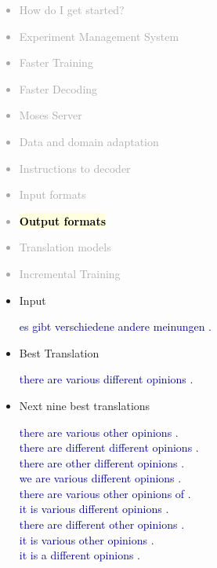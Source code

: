 \documentclass[landscape]{uedslides2C}
\newcommand{\example}[1]{\textcolor{darkblue}{\rm #1}}
\newcommand{\currenttopic}[1]{\colorbox{lightyellow}{\textcolor{black}{\bf #1}}}
\begin{document}

\vspace{-5mm}
\textcolor{darkgrey}{
\small
\begin{itemize} \itemsep -1mm
\item {How do I get started?}
\item {Experiment Management System}
\item {Faster Training}
\item {Faster Decoding}
\item {Moses Server}
\item {Data and domain adaptation}
\item {Instructions to decoder}
\item {Input formats}
\item \currenttopic{Output formats}
\item {Translation models}
\item {Incremental Training}
\end{itemize}
}



\begin{itemize}
\item Input \vspace{-5mm}
\begin{center}
\example{es gibt verschiedene andere meinungen .}
\end{center}

\item  Best Translation \vspace{-5mm}
\begin{center}
\example{there are various different opinions .}
\end{center}

\item  Next nine best translations \vspace{-5mm}
{\footnotesize \begin{center}
\example{
there are various other opinions . \\
there are different different opinions . \\
there are other different opinions . \\
we are various different opinions . \\
there are various other opinions of . \\
it is various different opinions . \\
there are different other opinions . \\
it is various other opinions . \\
it is a different opinions .}
\end{center}}
\end{itemize}
\end{document}
